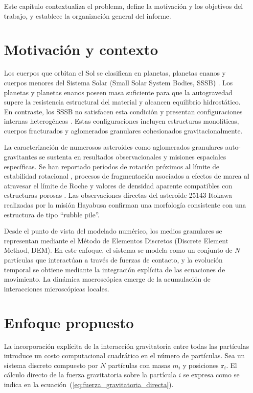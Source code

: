 \documentclass[a4paper,11pt]{book}
\begin{document}
Este capítulo contextualiza el problema, define la motivación y los objetivos del trabajo, y establece la organización general del informe.

\section{Motivación y contexto}

Los cuerpos que orbitan el Sol se clasifican en planetas, planetas enanos y cuerpos menores del Sistema Solar (Small Solar System Bodies, SSSB) \cite{13}. Los planetas y planetas enanos poseen masa suficiente para que la autogravedad supere la resistencia estructural del material y alcancen equilibrio hidrostático. En contraste, los SSSB no satisfacen esta condición y presentan configuraciones internas heterogéneas \cite{14}. Estas configuraciones incluyen estructuras monolíticas, cuerpos fracturados y aglomerados granulares cohesionados gravitacionalmente.

La caracterización de numerosos asteroides como aglomerados granulares auto-gravitantes se sustenta en resultados observacionales y misiones espaciales específicas. Se han reportado períodos de rotación próximos al límite de estabilidad rotacional \cite{16}, procesos de fragmentación asociados a efectos de marea al atravesar el límite de Roche \cite{17,18} y valores de densidad aparente compatibles con estructuras porosas \cite{14}. Las observaciones directas del asteroide 25143 Itokawa realizadas por la misión Hayabusa \cite{15} confirman una morfología consistente con una estructura de tipo ``rubble pile''.

Desde el punto de vista del modelado numérico, los medios granulares se representan mediante el Método de Elementos Discretos (Discrete Element Method, DEM). En este enfoque, el sistema se modela como un conjunto de $N$ partículas que interactúan a través de fuerzas de contacto, y la evolución temporal se obtiene mediante la integración explícita de las ecuaciones de movimiento. La dinámica macroscópica emerge de la acumulación de interacciones microscópicas locales.

\section{Enfoque propuesto}

La incorporación explícita de la interacción gravitatoria entre todas las partículas introduce un costo computacional cuadrático en el número de partículas. Sea un sistema discreto compuesto por $N$ partículas con masas $m_i$ y posiciones $\mathbf{r}_i$. El cálculo directo de la fuerza gravitatoria sobre la partícula $i$ se expresa como se indica en la ecuación~(\ref{eq:fuerza_gravitatoria_directa}).
\end{document}
